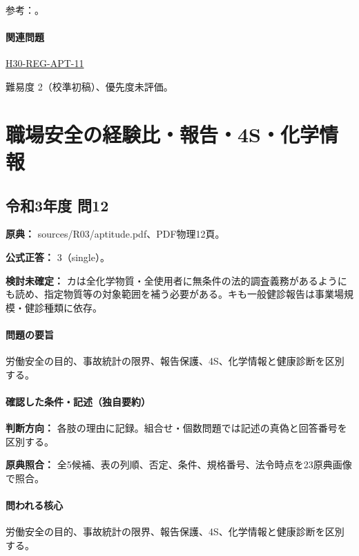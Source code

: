 \par 参考：\cite{saf_ra2006}。

\paragraph{関連問題} \hyperref[q:h30-reg-apt-11]{H30-REG-APT-11}

\par 難易度 2（校準初稿）、優先度未評価。

\section{職場安全の経験比・報告・4S・化学情報}

\subsection{令和3年度 問12}
\label{q:r03-reg-apt-12}

\noindent\textbf{原典：} sources/R03/aptitude.pdf、PDF物理12頁。

\textbf{公式正答：} 3（single）。

\par\textbf{検討未確定：} カは全化学物質・全使用者に無条件の法的調査義務があるようにも読め、指定物質等の対象範囲を補う必要がある。キも一般健診報告は事業場規模・健診種類に依存。

\paragraph{問題の要旨} 労働安全の目的、事故統計の限界、報告保護、4S、化学情報と健康診断を区別する。

\paragraph{確認した条件・記述（独自要約）}\mbox{}\par

\noindent\textbf{判断方向：} 各肢の理由に記録。組合せ・個数問題では記述の真偽と回答番号を区別する。\par

\noindent\textbf{原典照合：} 全5候補、表の列順、否定、条件、規格番号、法令時点を23原典画像で照合。\par

\paragraph{問われる核心} 労働安全の目的、事故統計の限界、報告保護、4S、化学情報と健康診断を区別する。


